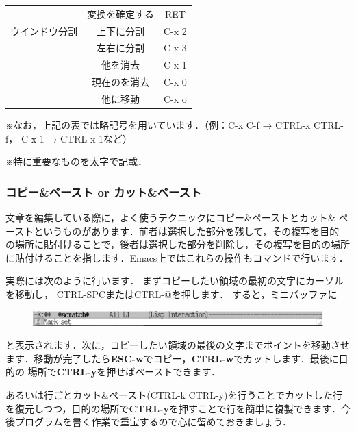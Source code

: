 \documentclass{jarticle}
\begin{document}
\begin{table}[H]
\begin{minipage}{0.5\hsize}
\begin{center}
\begin{tabular}{|c|c|c|}
                &  変換を確定する  & RET \\
ウインドウ分割 & 上下に分割 & C-x 2\\
                      & 左右に分割 & C-x 3 \\
                      & 他を消去 & C-x 1  \\
                      & 現在のを消去 & C-x 0 \\
                      & 他に移動 & C-x o \\
                      \hline
                    \end{tabular}
                  \end{center}
                  \label{table:two}
                \end{minipage}
              \end{table}
              
※なお，上記の表では略記号を用いています．（例：C-x C-f → CTRL-x CTRL-f，
C-x 1 → CTRL-x 1など）

※特に重要なものを太字で記載．

\subsubsection{コピー\&ペースト or カット\&ペースト}
文章を編集している際に，よく使うテクニックにコピー\&ペーストとカット\&
ペーストというものがあります．前者は選択した部分を残して，その複写を目的
の場所に貼付けることで，後者は選択した部分を削除し，その複写を目的の場所
に貼付けることを指します．Emacs上ではこれらの操作もコマンドで行います．

実際には次のように行います．
まずコピーしたい領域の最初の文字にカーソルを移動し，
CTRL-SPCまたはCTRL-@を押します．
すると，ミニバッファに

\begin{figure}[ht]
  \begin{center}
    \includegraphics[width=130mm,pagebox=cropbox,clip]{fig/emacs003.pdf}
  \end{center}
\end{figure}

\noindent
と表示されます．次に，コピーしたい領域の最後の文字までポイントを移動させ
ます．移動が完了したら{\bf ESC-w}でコピー，{\bf CTRL-w}でカットします．最後に目的の
場所で{\bf CTRL-y}を押せばペーストできます．

あるいは行ごとカット\&ペースト(CTRL-k CTRL-y)を行うことでカットした行を復元しつつ，目的の場所で{\bf CTRL-y}を押すことで行を簡単に複製できます．今後プログラムを書く作業で重宝するので心に留めておきましょう．
\end{document}
